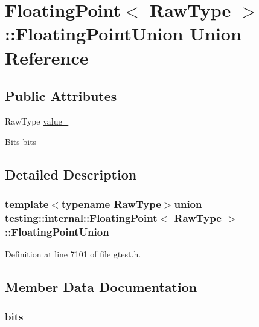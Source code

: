 \hypertarget{uniontesting_1_1internal_1_1FloatingPoint_1_1FloatingPointUnion}{\section{\-Floating\-Point$<$ \-Raw\-Type $>$\-:\-:\-Floating\-Point\-Union \-Union \-Reference}
\label{d6/dd2/uniontesting_1_1internal_1_1FloatingPoint_1_1FloatingPointUnion}
}
\subsection*{\-Public \-Attributes}
\begin{DoxyCompactItemize}
\item 
\-Raw\-Type \hyperlink{uniontesting_1_1internal_1_1FloatingPoint_1_1FloatingPointUnion_a4c63184d103d6c4952511640f80e90a3}{value\-\_\-}
\item 
\hyperlink{classtesting_1_1internal_1_1FloatingPoint_adb12c064e30491d4976393880f9dca27}{\-Bits} \hyperlink{uniontesting_1_1internal_1_1FloatingPoint_1_1FloatingPointUnion_af47349c770ec7adda84198491ccc7f4d}{bits\-\_\-}
\end{DoxyCompactItemize}


\subsection{\-Detailed \-Description}
\subsubsection*{template$<$typename \-Raw\-Type$>$union testing\-::internal\-::\-Floating\-Point$<$ Raw\-Type $>$\-::\-Floating\-Point\-Union}



\-Definition at line 7101 of file gtest.\-h.



\subsection{\-Member \-Data \-Documentation}
\hypertarget{uniontesting_1_1internal_1_1FloatingPoint_1_1FloatingPointUnion_af47349c770ec7adda84198491ccc7f4d}{
\subsubsection[{bits\-\_\-}]{ {\bf bits\-\_\-}}}\label{d6/dd2/uniontesting_1_1internal_1_1FloatingPoint_1_1FloatingPointUnion_af47349c770ec7adda84198491ccc7f4d}


